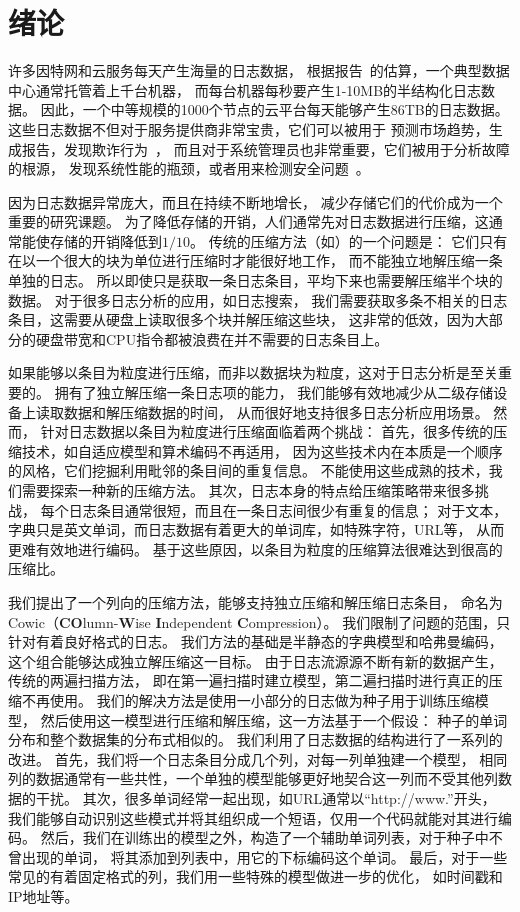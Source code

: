 \chapter{绪论}
\label{chap:introduction}


许多因特网和云服务每天产生海量的日志数据，
根据报告~\cite{Logothetis2011}的估算，一个典型数据中心通常托管着上千台机器，
而每台机器每秒要产生1-10MB的半结构化日志数据。
因此，一个中等规模的1000个节点的云平台每天能够产生86TB的日志数据。
这些日志数据不但对于服务提供商非常宝贵，它们可以被用于
预测市场趋势，生成报告，发现欺诈行为~\cite{Oliner2012,ananthanarayanan2013photon}，
而且对于系统管理员也非常重要，它们被用于分析故障的根源，
发现系统性能的瓶颈，或者用来检测安全问题~\cite{Fu2009,Logothetis2011,Xu2009}。

因为日志数据异常庞大，而且在持续不断地增长，
减少存储它们的代价成为一个重要的研究课题。
为了降低存储的开销，人们通常先对日志数据进行压缩，这通常能使存储的开销降低到$1/10$。
传统的压缩方法（如）的一个问题是：
它们只有在以一个很大的块为单位进行压缩时才能很好地工作，
而不能独立地解压缩一条单独的日志。
所以即使只是获取一条日志条目，平均下来也需要解压缩半个块的数据。
对于很多日志分析的应用，如日志搜索，
我们需要获取多条不相关的日志条目，这需要从硬盘上读取很多个块并解压缩这些块，
这非常的低效，因为大部分的硬盘带宽和CPU指令都被浪费在并不需要的日志条目上。

如果能够以条目为粒度进行压缩，而非以数据块为粒度，这对于日志分析是至关重要的。
拥有了独立解压缩一条日志项的能力，
我们能够有效地减少从二级存储设备上读取数据和解压缩数据的时间，
从而很好地支持很多日志分析应用场景。
然而， 针对日志数据以条目为粒度进行压缩面临着两个挑战：
首先，很多传统的压缩技术，如自适应模型和算术编码不再适用，
因为这些技术内在本质是一个顺序的风格，它们挖掘利用毗邻的条目间的重复信息。
不能使用这些成熟的技术，我们需要探索一种新的压缩方法。
其次，日志本身的特点给压缩策略带来很多挑战，
每个日志条目通常很短，而且在一条日志间很少有重复的信息；
对于文本，字典只是英文单词，而日志数据有着更大的单词库，如特殊字符，URL等，
从而更难有效地进行编码。
基于这些原因，以条目为粒度的压缩算法很难达到很高的压缩比。

我们提出了一个列向的压缩方法，能够支持独立压缩和解压缩日志条目，
命名为Cowic（\textbf{CO}lumn-\textbf{W}ise \textbf{I}ndependent \textbf{C}ompression）。
我们限制了问题的范围，只针对有着良好格式的日志。
我们方法的基础是半静态的字典模型和哈弗曼编码，
这个组合能够达成独立解压缩这一目标。
由于日志流源源不断有新的数据产生，传统的两遍扫描方法，
即在第一遍扫描时建立模型，第二遍扫描时进行真正的压缩不再使用。
我们的解决方法是使用一小部分的日志做为种子用于训练压缩模型，
然后使用这一模型进行压缩和解压缩，这一方法基于一个假设：
种子的单词分布和整个数据集的分布式相似的。
我们利用了日志数据的结构进行了一系列的改进。
首先，我们将一个日志条目分成几个列，对每一列单独建一个模型，
相同列的数据通常有一些共性，一个单独的模型能够更好地契合这一列而不受其他列数据的干扰。
其次，很多单词经常一起出现，如URL通常以``http://www.''开头，
我们能够自动识别这些模式并将其组织成一个短语，仅用一个代码就能对其进行编码。
然后，我们在训练出的模型之外，构造了一个辅助单词列表，对于种子中不曾出现的单词，
将其添加到列表中，用它的下标编码这个单词。
最后，对于一些常见的有着固定格式的列，我们用一些特殊的模型做进一步的优化，
如时间戳和IP地址等。

